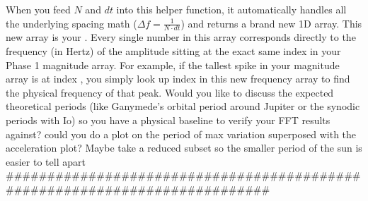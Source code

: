 \markdownRendererOlEnd \markdownRendererInterblockSeparator
{}
\markdownRendererSectionEnd \markdownRendererSectionBegin
{}\markdownRendererInterblockSeparator
{}When you feed $N$ and $dt$ into this helper function, it automatically handles all the underlying spacing math ($\Delta f = \frac{1}{N \cdot dt}$) and returns a brand new 1D array.\markdownRendererInterblockSeparator
{}This new array is your . Every single number in this array corresponds directly to the frequency (in Hertz) of the amplitude sitting at the exact same index in your Phase 1 magnitude array.\markdownRendererInterblockSeparator
{}For example, if the tallest spike in your magnitude array is at index , you simply look up index  in this new frequency array to find the physical frequency of that peak.\markdownRendererInterblockSeparator
{}\markdownRendererThematicBreak{}\markdownRendererInterblockSeparator
{}Would you like to discuss the expected theoretical periods (like Ganymede's orbital period around Jupiter or the synodic periods with Io) so you have a physical baseline to verify your FFT results against?\markdownRendererInterblockSeparator
{}\markdownRendererThematicBreak{}\markdownRendererInterblockSeparator
{}
\markdownRendererSectionEnd 
\markdownRendererSectionEnd \markdownRendererSectionBegin
{}\markdownRendererInterblockSeparator
{}could you do a plot on the period of max variation superposed with the acceleration plot? Maybe take a reduced subset so the smaller period of the sun is easier to tell apart\markdownRendererInterblockSeparator
{}###########################################################################\markdownRendererInterblockSeparator
{}
\markdownRendererSectionEnd 
\markdownRendererSectionEnd \markdownRendererSectionBegin
\markdownRendererHeadingOne{}\markdownRendererInterblockSeparator
{}
\markdownRendererSectionEnd \markdownRendererSectionBegin
{}\markdownRendererInterblockSeparator
{}
\markdownRendererSectionEnd \markdownRendererSectionBegin
\markdownRendererHeadingOne{}\markdownRendererInterblockSeparator
{}
\markdownRendererSectionEnd \markdownRendererSectionBegin
{}\markdownRendererInterblockSeparator
{}
\markdownRendererSectionEnd \markdownRendererSectionBegin
\markdownRendererHeadingOne{}\markdownRendererInterblockSeparator
